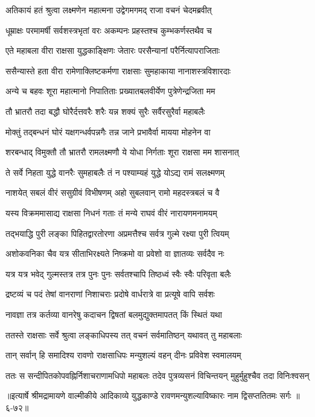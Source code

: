 
\twolineshloka
{अतिकायं हतं श्रुत्वा लक्ष्मणेन महात्मना}
{उद्वेगमगमद् राजा वचनं चेदमब्रवीत्} %

\twolineshloka
{धूम्राक्षः परमामर्षी सर्वशस्त्रभृतां वरः}
{अकम्पनः प्रहस्तश्च कुम्भकर्णस्तथैव च} %

\twolineshloka
{एते महाबला वीरा राक्षसा युद्धकाङ्क्षिणः}
{जेतारः परसैन्यानां परैर्नित्यापराजिताः} %

\twolineshloka
{ससैन्यास्ते हता वीरा रामेणाक्लिष्टकर्मणा}
{राक्षसाः सुमहाकाया नानाशस्त्रविशारदाः} %

\twolineshloka
{अन्ये च बहवः शूरा महात्मानो निपातिताः}
{प्रख्यातबलवीर्येण पुत्रेणेन्द्रजिता मम} %

\twolineshloka
{तौ भ्रातरौ तदा बद्धौ घोरैर्दत्तवरैः शरैः}
{यन्न शक्यं सुरैः सर्वैरसुरैर्वा महाबलैः} %

\twolineshloka
{मोक्तुं तद्बन्धनं घोरं यक्षगन्धर्वपन्नगैः}
{तन्न जाने प्रभावैर्वा मायया मोहनेन वा} %

\twolineshloka
{शरबन्धाद् विमुक्तौ तौ भ्रातरौ रामलक्ष्मणौ}
{ये योधा निर्गताः शूरा राक्षसा मम शासनात्} %

\twolineshloka
{ते सर्वे निहता युद्धे वानरैः सुमहाबलैः}
{तं न पश्याम्यहं युद्धे योऽद्य रामं सलक्ष्मणम्} %

\twolineshloka
{नाशयेत् सबलं वीरं ससुग्रीवं विभीषणम्}
{अहो सुबलवान् रामो महदस्त्रबलं च वै} %

\twolineshloka
{यस्य विक्रममासाद्य राक्षसा निधनं गताः}
{तं मन्ये राघवं वीरं नारायणमनामयम्} %

\twolineshloka
{तद्भयाद्धि पुरी लङ्का पिहितद्वारतोरणा}
{अप्रमत्तैश्च सर्वत्र गुल्मे रक्ष्या पुरी त्वियम्} %

\twolineshloka
{अशोकवनिका चैव यत्र सीताभिरक्ष्यते}
{निष्क्रमो वा प्रवेशो वा ज्ञातव्यः सर्वदैव नः} %

\twolineshloka
{यत्र यत्र भवेद् गुल्मस्तत्र तत्र पुनः पुनः}
{सर्वतश्चापि तिष्ठध्वं स्वैः स्वैः परिवृता बलैः} %

\twolineshloka
{द्रष्टव्यं च पदं तेषां वानराणां निशाचराः}
{प्रदोषे वार्धरात्रे वा प्रत्यूषे वापि सर्वशः} %

\twolineshloka
{नावज्ञा तत्र कर्तव्या वानरेषु कदाचन}
{द्विषतां बलमुद्युक्तमापतत् किं स्थितं यथा} %

\twolineshloka
{ततस्ते राक्षसाः सर्वे श्रुत्वा लङ्काधिपस्य तत्}
{वचनं सर्वमातिष्ठन् यथावत् तु महाबलाः} %

\twolineshloka
{तान् सर्वान् हि समादिश्य रावणो राक्षसाधिपः}
{मन्युशल्यं वहन् दीनः प्रविवेश स्वमालयम्} %

\twolineshloka
{ततः स सन्दीपितकोपवह्निर्निशाचराणामधिपो महाबलः}
{तदेव पुत्रव्यसनं विचिन्तयन् मुहुर्मुहुश्चैव तदा विनिःश्वसन्} %


॥इत्यार्षे श्रीमद्रामायणे वाल्मीकीये आदिकाव्ये युद्धकाण्डे रावणमन्युशल्याविष्कारः नाम द्विसप्ततितमः सर्गः ॥६-७२॥
